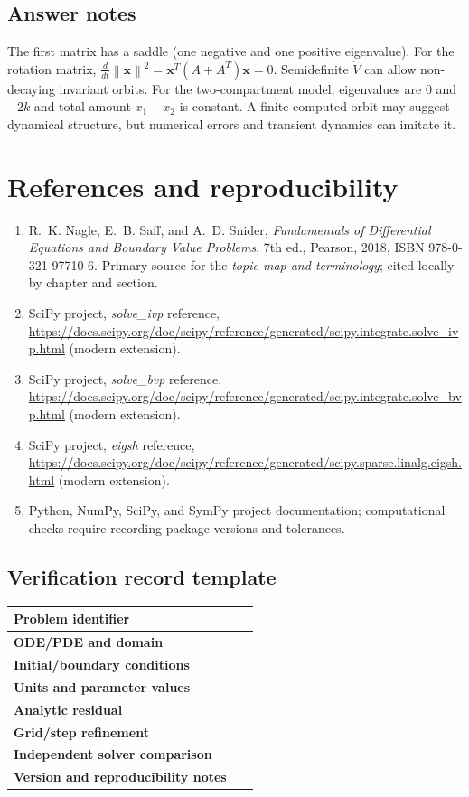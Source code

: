 \documentclass[11pt,letterpaper,oneside]{report}
\theoremstyle{definition}\newtheorem{definition}[theorem]{Definition}
\theoremstyle{remark}\newtheorem{remark}[theorem]{Remark}
\newcommand{\norm}[1]{\left\lVert#1\right\rVert}
\begin{document}
\section{Answer notes}
The first matrix has a saddle (one negative and one positive eigenvalue). For the rotation matrix, $\frac{d}{dt}\norm{\mathbf x}^2=\mathbf x^T(A+A^T)\mathbf x=0$. Semidefinite $\dot V$ can allow non-decaying invariant orbits. For the two-compartment model, eigenvalues are $0$ and $-2k$ and total amount $x_1+x_2$ is constant. A finite computed orbit may suggest dynamical structure, but numerical errors and transient dynamics can imitate it.

\appendix
\chapter{References and reproducibility}
\begin{enumerate}
\item R.~K. Nagle, E.~B. Saff, and A.~D. Snider, \emph{Fundamentals of Differential Equations and Boundary Value Problems}, 7th ed., Pearson, 2018, ISBN 978-0-321-97710-6. Primary source for the \emph{topic map and terminology}; cited locally by chapter and section.
\item SciPy project, \emph{solve\_ivp} reference, \url{https://docs.scipy.org/doc/scipy/reference/generated/scipy.integrate.solve_ivp.html} (modern extension).
\item SciPy project, \emph{solve\_bvp} reference, \url{https://docs.scipy.org/doc/scipy/reference/generated/scipy.integrate.solve_bvp.html} (modern extension).
\item SciPy project, \emph{eigsh} reference, \url{https://docs.scipy.org/doc/scipy/reference/generated/scipy.sparse.linalg.eigsh.html} (modern extension).
\item Python, NumPy, SciPy, and SymPy project documentation; computational checks require recording package versions and tolerances.
\end{enumerate}
\section*{Verification record template}
\begin{tabularx}{\textwidth}{>{\bfseries}p{}X}\toprule
Problem identifier & \rule{0pt}{15pt}\ \\ \midrule
ODE/PDE and domain & \\[8pt]
Initial/boundary conditions & \\[8pt]
Units and parameter values & \\[8pt]
Analytic residual & \\ [8pt]
Grid/step refinement & \\ [8pt]
Independent solver comparison & \\ [8pt]
Version and reproducibility notes & \\ [8pt]\bottomrule
\end{tabularx}
\end{document}
